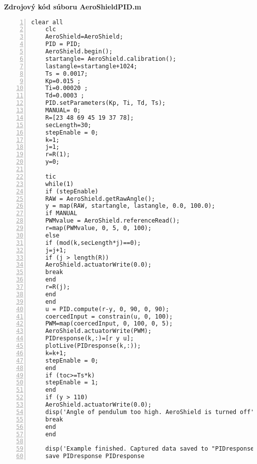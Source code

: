 \LARGE\bf{Zdrojový kód súboru AeroShieldPID.m}
\label{AeroShieldPID.m}
\vspace{1cm}
\begin{lstlisting}[numbers=left,basicstyle=\scriptsize,caption={Zdrojový kód súboru AeroShieldPID.m.},captionpos=b]	
	clear all
	clc 
	AeroShield=AeroShield; 
	PID = PID;
	AeroShield.begin();
	startangle= AeroShield.calibration(); 
	lastangle=startangle+1024; 
	Ts = 0.0017;   
	Kp=0.015 ;
	Ti=0.00020 ;
	Td=0.0003 ;  
	PID.setParameters(Kp, Ti, Td, Ts);
	MANUAL= 0;
	R=[23 48 69 45 19 37 78];
	secLength=30; 
	stepEnable = 0;  
	k=1; 
	j=1;
	r=R(1);
	y=0;      
	
	tic 
	while(1) 
	if (stepEnable) 
	RAW = AeroShield.getRawAngle();
	y = map(RAW, startangle, lastangle, 0.0, 100.0);
	if MANUAL  
	PWMvalue = AeroShield.referenceRead(); 
	r=map(PWMvalue, 0, 5, 0, 100);
	else 
	if (mod(k,secLength*j)==0); 
	j=j+1; 
	if (j > length(R)) 
	AeroShield.actuatorWrite(0.0); 
	break  
	end
	r=R(j); 
	end
	end
	u = PID.compute(r-y, 0, 90, 0, 90); 
	coercedInput = constrain(u, 0, 100); 
	PWM=map(coercedInput, 0, 100, 0, 5); 
	AeroShield.actuatorWrite(PWM); 
	PIDresponse(k,:)=[r y u];
	plotLive(PIDresponse(k,:)); 
	k=k+1;  
	stepEnable = 0; 
	end      
	if (toc>=Ts*k)      
	stepEnable = 1;            
	end
	if (y > 110)        
	AeroShield.actuatorWrite(0.0); 
	disp('Angle of pendulum too high. AeroShield is turned off')
	break                     
	end
	end   
	
	disp('Example finished. Captured data saved to "PIDresponse.mat" file.')
	save PIDresponse PIDresponse     
\end{lstlisting}
